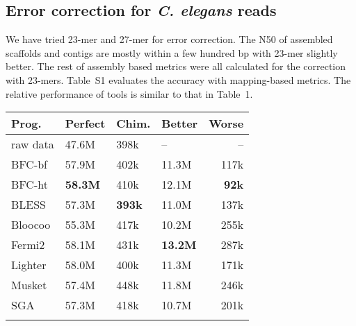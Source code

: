 \documentclass{bioinfo2}
\begin{document}
\subsection{Error correction for {\it C. elegans} reads}

We have tried 23-mer and 27-mer for error correction. The N50 of assembled
scaffolds and contigs are mostly within a few hundred bp with 23-mer
slightly better. The rest of assembly based metrics were all calculated
for the correction with 23-mers. Table~S1 evaluates the accuracy with
mapping-based metrics. The relative performance of tools is similar to that in
Table~1.

\begin{table}[t]
{\footnotesize
\begin{tabular}{p{2cm}p{1.35cm}p{1.35cm}p{1.35cm}r}
\toprule
Prog.     & Perfect&Chim.& Better & Worse \\
\midrule
raw data  & 47.6M  & 398k  & --     & --   \\
BFC-bf    & 57.9M  & 402k  & 11.3M  & 117k \\
BFC-ht    &{\bf 58.3M}  & 410k  & 12.1M  & {\bf 92k}  \\
BLESS     & 57.3M  & {\bf 393k}  & 11.0M  & 137k \\
Bloocoo   & 55.3M  & 417k  & 10.2M  & 255k \\
Fermi2    & 58.1M  & 431k  & {\bf 13.2M}  & 287k \\
Lighter   & 58.0M  & 400k  & 11.3M  & 171k \\
Musket    & 57.4M  & 448k  & 11.8M  & 246k \\
SGA       & 57.3M  & 418k  & 10.7M  & 201k \\
\botrule
\end{tabular}}{}
\end{table}
\end{document}
